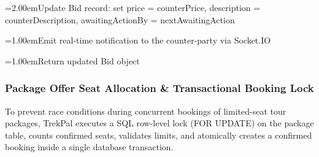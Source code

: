 \documentclass[12pt,a4paper]{article}
\newlength{\ThesisParagraphIndent}
\newcommand{\ThesisParagraph}[1]{%
  \par\begingroup
  \setlength{\leftskip}{\ThesisParagraphIndent}%
  \setlength{\parindent}{0pt}%
  \noindent#1\par
  \endgroup}
\begin{document}
{\noindent\hangindent=2.00em\hspace*{1.00em}Update Bid record: set price = counterPrice, description = counterDescription, awaitingActionBy = nextAwaitingAction\par
\noindent\hangindent=1.00em\hspace*{0.00em}Emit real-time notification to the counter-party via Socket.IO\par
\noindent\hangindent=1.00em\hspace*{0.00em}Return updated Bid object\par
}


\subsubsection{Package Offer Seat Allocation \& Transactional Booking Lock}

\ThesisParagraph{To prevent race conditions during concurrent bookings of limited-seat tour packages, TrekPal executes a SQL row-level lock (FOR UPDATE) on the package table, counts confirmed seats, validates limits, and atomically creates a confirmed booking inside a single database transaction.}
\end{document}
